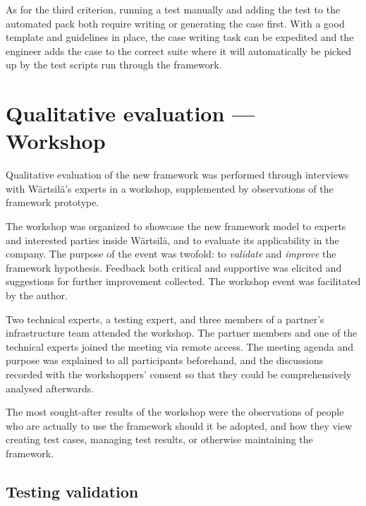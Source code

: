 \documentclass[12pt,a4paper,oneside,pdftex]{report}
\begin{document}
{As for the third criterion, running a test manually and adding the test to the automated pack both require writing or generating the case first. With a good template and guidelines in place, the case writing task can be expedited and the engineer adds the case to the correct suite where it will automatically be picked up by the test scripts run through the framework.
 
\section{Qualitative evaluation --- Workshop}



Qualitative evaluation of the new framework was performed through interviews with Wärtsilä's experts in a workshop, supplemented by observations of the framework prototype. 

The workshop was organized to showcase the new framework model to experts and interested parties inside Wärtsilä, and to evaluate its applicability in the company. The purpose of the event was twofold: to \emph{validate} and \emph{improve} the framework hypothesis. Feedback both critical and supportive was elicited and suggestions for further improvement collected. The workshop event was facilitated by the author.

Two technical experts, a testing expert, and three members of a partner's infrastructure team attended the workshop. The partner members and one of the technical experts joined the meeting via remote access. The meeting agenda and purpose was explained to all participants beforehand, and the discussions recorded with the workshoppers' consent so that they could be comprehensively analysed afterwards.

The most sought-after results of the workshop were the observations of people who are actually to use the framework should it be adopted, and how they view creating test cases, managing test results, or otherwise maintaining the framework.

\subsection{Testing validation}

}
\end{document}
